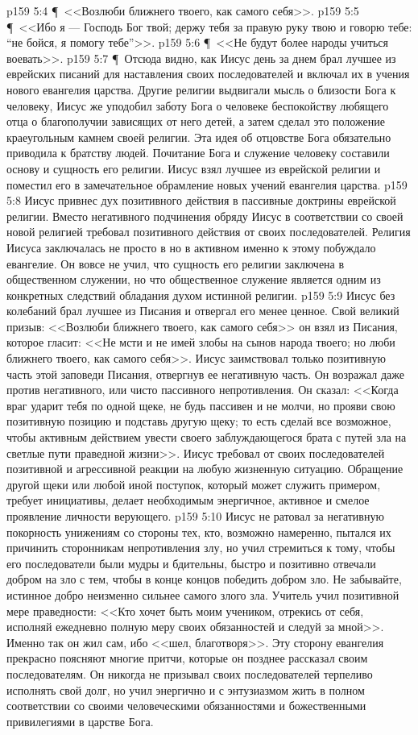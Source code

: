 \vs p159 5:4 \P\ <<Возлюби ближнего твоего, как самого себя>>.
\vs p159 5:5 \P\ <<Ибо я --- Господь Бог твой; держу тебя за правую руку твою и говорю тебе: “не бойся, я помогу тебе”>>.
\vs p159 5:6 \P\ <<Не будут более народы учиться воевать>>.
\vs p159 5:7 \P\ Отсюда видно, как Иисус день за днем брал лучшее из еврейских писаний для наставления своих последователей и включал их в учения нового евангелия царства. Другие религии выдвигали мысль о близости Бога к человеку, Иисус же уподобил заботу Бога о человеке беспокойству любящего отца о благополучии зависящих от него детей, а затем сделал это положение краеугольным камнем своей религии. Эта идея об отцовстве Бога обязательно приводила к братству людей. Почитание Бога и служение человеку составили основу и сущность его религии. Иисус взял лучшее из еврейской религии и поместил его в замечательное обрамление новых учений евангелия царства.
\vs p159 5:8 Иисус привнес дух позитивного действия в пассивные доктрины еврейской религии. Вместо негативного подчинения обряду Иисус в соответствии со своей новой религией требовал позитивного действия от своих последователей. Религия Иисуса заключалась не просто в  но в активном  именно к этому побуждало евангелие. Он вовсе не учил, что сущность его религии заключена в общественном служении, но что общественное служение является одним из конкретных следствий обладания духом истинной религии.
\vs p159 5:9 Иисус без колебаний брал лучшее из Писания и отвергал его менее ценное. Свой великий призыв: <<Возлюби ближнего твоего, как самого себя>> он взял из Писания, которое гласит: <<Не мсти и не имей злобы на сынов народа твоего; но люби ближнего твоего, как самого себя>>. Иисус заимствовал только позитивную часть этой заповеди Писания, отвергнув ее негативную часть. Он возражал даже против негативного, или чисто пассивного непротивления. Он сказал: <<Когда враг ударит тебя по одной щеке, не будь пассивен и не молчи, но прояви свою позитивную позицию и подставь другую щеку; то есть сделай все возможное, чтобы активным действием увести своего заблуждающегося брата с путей зла на светлые пути праведной жизни>>. Иисус требовал от своих последователей позитивной и агрессивной реакции на любую жизненную ситуацию. Обращение другой щеки или любой иной поступок, который может служить примером, требует инициативы, делает необходимым энергичное, активное и смелое проявление личности верующего.
\vs p159 5:10 Иисус не ратовал за негативную покорность унижениям со стороны тех, кто, возможно намеренно, пытался их причинить сторонникам непротивления злу, но учил стремиться к тому, чтобы его последователи были мудры и бдительны, быстро и позитивно отвечали добром на зло с тем, чтобы в конце концов победить добром зло. Не забывайте, истинное добро неизменно сильнее самого злого зла. Учитель учил позитивной мере праведности: <<Кто хочет быть моим учеником, отрекись от себя, исполняй ежедневно полную меру своих обязанностей и следуй за мной>>. Именно так он жил сам, ибо <<шел, благотворя>>. Эту сторону евангелия прекрасно поясняют многие притчи, которые он позднее рассказал своим последователям. Он никогда не призывал своих последователей терпеливо исполнять свой долг, но учил энергично и с энтузиазмом жить в полном соответствии со своими человеческими обязанностями и божественными привилегиями в царстве Бога.

